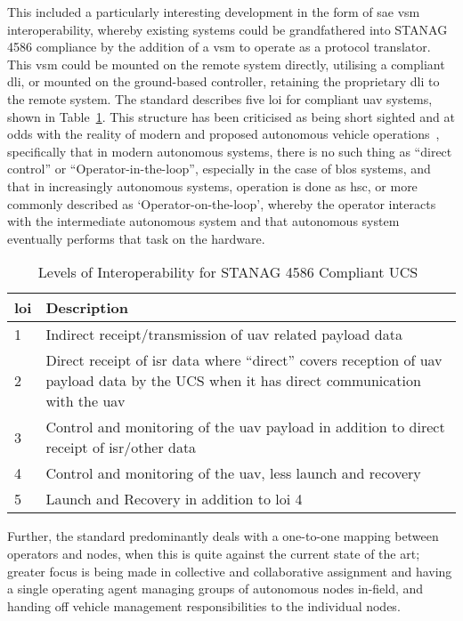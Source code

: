 This included a particularly interesting development in the form of \gls{sae} \gls{vsm} interoperability, whereby existing systems could be grandfathered into STANAG 4586 compliance by the addition of a \gls{vsm} to operate as a protocol translator.
This \gls{vsm} could be mounted on the remote system directly, utilising a compliant \gls{dli}, or mounted on the ground-based controller, retaining the proprietary \gls{dli} to the remote system.
The standard describes five \acrfull{loi} for compliant \gls{uav} systems, shown in Table~\ref{tab:levels_of_interoperability}.
This structure has been criticised as being short sighted and at odds with the reality of modern and proposed autonomous vehicle operations~\cite{Cummings2010}, specifically that in modern autonomous systems, there is no such thing as ``direct control'' or ``Operator-in-the-loop'', especially in the case of \gls{blos} systems, and that in increasingly autonomous systems, operation is done as \gls{hsc}, or more commonly described as ‘Operator-on-the-loop’, whereby the operator interacts with the intermediate autonomous system and that autonomous system eventually performs that task on the hardware.

\begin{table}
  \begin{tabularx}{\textwidth}{lX}
    \toprule
    \gls{loi} &  Description\\ \midrule
    1 &  Indirect receipt/transmission of \gls{uav} related payload data\\ 
    2 &  Direct receipt of \gls{isr} data where “direct” covers reception of \gls{uav} payload data by the UCS when it has direct communication with the \gls{uav}\\ 
    3 &  Control and monitoring of the \gls{uav} payload in addition to direct receipt of \gls{isr}/other data\\ 
    4 &  Control and monitoring of the \gls{uav}, less launch and recovery\\
    5 &  Launch and Recovery in addition to \gls{loi} 4\\ 
    \bottomrule 
  \end{tabularx}
  \caption[\gls{loi} for STANAG 4586 Compliant UCS]{Levels of Interoperability for STANAG 4586 Compliant UCS~\cite{STANAG4586}}
  \label{tab:levels_of_interoperability}
\end{table}

Further, the standard predominantly deals with a one-to-one mapping between operators and nodes, when this is quite against the current state of the art; greater focus is being made in collective and collaborative assignment and having a single operating agent managing groups of autonomous nodes in-field, and handing off vehicle management responsibilities to the individual nodes.

